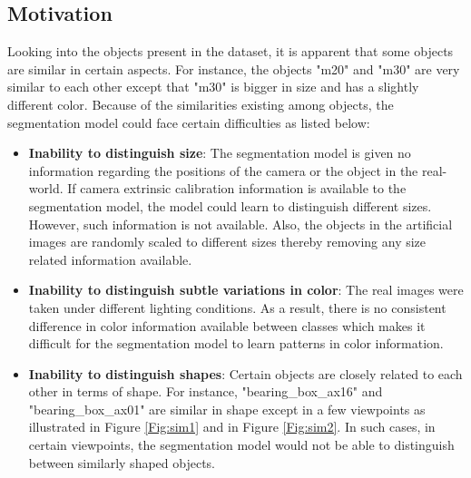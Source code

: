 	\subsection{Motivation}
		Looking into the objects present in the dataset, it is apparent that some objects are similar in certain aspects. For instance, the objects "m20" and "m30" are very similar to each other except that "m30" is bigger in size and has a slightly different color. Because of the similarities existing among objects, the segmentation model could face certain difficulties as listed below:
		\begin{itemize}
			\item \textbf{Inability to distinguish size}: The segmentation model is given no information regarding the positions of the camera or the object in the real-world. If camera extrinsic calibration information is available to the segmentation model, the model could learn to distinguish different sizes. However, such information is not available. Also, the objects in the artificial images are randomly scaled to different sizes thereby removing any size related information available.
			\item \textbf{Inability to distinguish subtle variations in color}: The real images were taken under different lighting conditions. As a result, there is no consistent difference in color information available between classes which makes it difficult for the segmentation model to learn patterns in color information.
			\item \textbf{Inability to distinguish shapes}: Certain objects are closely related to each other in terms of shape. For instance, "bearing\_box\_ax16" and "bearing\_box\_ax01" are similar in shape except in a few viewpoints as illustrated in Figure \ref{Fig:sim1} and in Figure \ref{Fig:sim2}. In such cases, in certain viewpoints, the segmentation model would not be able to distinguish between similarly shaped objects.
			

\end{itemize}
